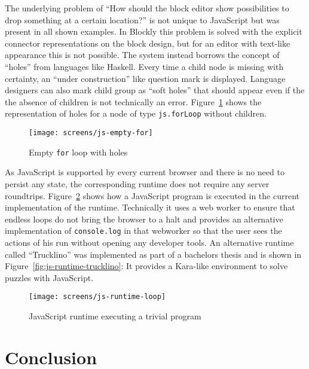 \documentclass[sigconf,natbib=false]{acmart}
\begin{document}
The underlying problem of \enquote{How should the block editor show possibilities to drop something at a certain location?} is not unique to JavaScript but was present in all shown examples. In Blockly this problem is solved with the explicit connector representations on the block design, but for an editor with text-like appearance this is not possible. The system instead borrows the concept of \enquote{holes} from languages like Haskell. Every time a child node is missing with certainty, an \enquote{under construction} like question mark is displayed. Language designers can also mark child group as \enquote{soft holes} that should appear even if the the absence of children is not technically an error. Figure~\ref{fig:screen-js-empty-for} shows the representation of holes for a node of type \texttt{js.forLoop} without children.

\begin{figure}[H]
  \texttt{[image: screens/js-empty-for]}
  \caption{Empty \texttt{for} loop with holes}
  \label{fig:screen-js-empty-for}
\end{figure}

As JavaScript is supported by every current browser and there is no need to persist any state, the corresponding runtime does not require any server roundtrips. Figure~\ref{fig:screen-js-runtime-loop} shows how a JavaScript program is executed in the current implementation of the runtime. Technically it uses a web worker to ensure that endless loops do not bring the browser to a halt and provides an alternative implementation of \texttt{console.log} in that webworker so that the user sees the actions of his run without opening any developer tools. An alternative runtime called \enquote{Trucklino} was implemented as part of a bachelors thesis\cite{popp_konzeption_2019} and is shown in Figure~\ref{fig:js-runtime-trucklino}: It provides a Kara-like\cite{hartmann_kara_2001} environment to solve puzzles with JavaScript.

\begin{figure}
  \texttt{[image: screens/js-runtime-loop]}
  \caption{JavaScript runtime executing a trivial program}
  \label{fig:screen-js-runtime-loop}
\end{figure}

\section{Conclusion}
\end{document}
